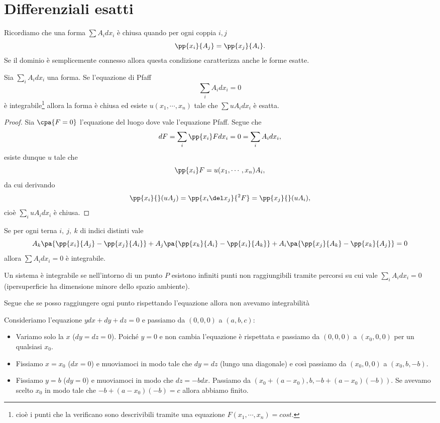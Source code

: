 \section{Differenziali esatti}
Ricordiamo che una forma $\sum A_i dx_i$ \`e chiusa quando per ogni coppia $i,j$
\[\pp {x_i}{A_j}=\pp{x_j}{A_i}.\]
Se il dominio \`e semplicemente connesso allora questa condizione caratterizza anche le forme esatte.

\begin{proposition}\label{EsattezzaPfaff}
Sia $\sum_i A_idx_i$ una forma. Se l'equazione di Pfaff
\[\sum_i A_idx_i=0\]
\`e integrabile\footnote{cio\`e i punti che la verificano sono descrivibili tramite una equazione $F(x_1,\cdots, x_n)=cost.$} allora la forma \`e chiusa ed esiste $u(x_1,\cdots, x_n)$ tale che $\sum uA_i dx_i$ \`e esatta.
\end{proposition}
\begin{proof}
Sia $\cpa{F=0}$ l'equazione del luogo dove vale l'equazione Pfaff. Segue che
\[dF=\sum_i\pp{x_i}F dx_i=0=\sum_i A_idx_i,\]
esiste dunque $u$ tale che
\[\pp{x_i}F=u(x_1,\cdots, x_n)A_i,\]
da cui derivando
\[\pp{x_i}{}(uA_j)=\pp{x_i\del x_j}{^2F}=\pp{x_j}{}(uA_i),\]
cio\`e $\sum_i uA_idx_i$ \`e chiusa.
\end{proof}

\begin{fact}
Se per ogni terna $i,\ j,\ k$ di indici distinti vale
\[A_k\pa{\pp {x_i}{A_j}-\pp {x_j}{A_i}}+A_j\pa{\pp {x_k}{A_i}-\pp {x_i}{A_k}}+A_i\pa{\pp {x_j}{A_k}-\pp {x_k}{A_j}}=0\]
allora $\sum A_i dx_i=0$ \`e integrabile.
\end{fact}

\begin{remark}\label{IntegrabilitaPuntiRaggiungibili}
Un sistema \`e integrabile se nell'intorno di un punto $P$ esistono infiniti punti non raggiungibili tramite percorsi su cui vale $\sum_i A_idx_i=0$ (ipersuperficie ha dimensione minore dello spazio ambiente).\medskip

\noindent
Segue che se posso raggiungere ogni punto rispettando l'equazione allora non avevamo integrabilit\`a
\end{remark}


\begin{example}
Consideriamo l'equazione $ydx+dy+dz=0$ e passiamo da $(0,0,0)$ a $(a,b,c)$:
\begin{itemize}
\item Variamo solo la $x$ ($dy=dz=0$). Poich\'e $y=0$ e non cambia l'equazione \`e rispettata e passiamo da $(0,0,0)$ a $(x_0,0,0)$ per un qualsiasi $x_0$.
\item Fissiamo $x=x_0$ ($dx=0$) e muoviamoci in modo tale che $dy=dz$ (lungo una diagonale) e cos\`i passiamo da $(x_0,0,0)$ a $(x_0,b,-b)$.
\item Fissiamo $y=b$ ($dy=0$) e muoviamoci in modo che $dz=-bdx$. Passiamo da $(x_0+(a-x_0),b,-b+(a-x_0)(-b))$. Se avevamo scelto $x_0$ in modo tale che $-b+(a-x_0)(-b)=c$ allora abbiamo finito.
\end{itemize}
\end{example}




